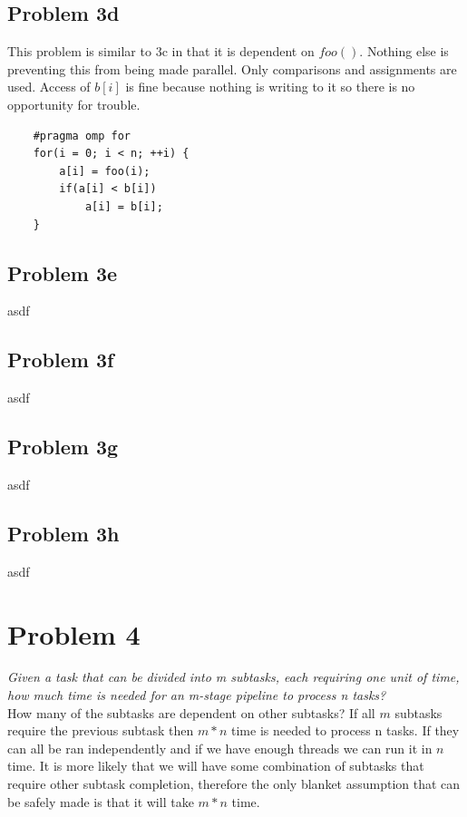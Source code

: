 \documentclass{article}
\begin{document}
\subsection{Problem 3d}
This problem is similar to 3c in that it is dependent on $foo()$. Nothing else is preventing this from being made parallel. Only comparisons and assignments are used. Access of $b[i]$ is fine because nothing is writing to it so there is no opportunity for trouble.
\begin{verbatim}
    #pragma omp for
    for(i = 0; i < n; ++i) {
        a[i] = foo(i);
        if(a[i] < b[i])
            a[i] = b[i];
    }
\end{verbatim}

\subsection{Problem 3e}
asdf

\subsection{Problem 3f}
asdf

\subsection{Problem 3g}
asdf

\subsection{Problem 3h}
asdf


\newpage
\section{Problem 4}
\textit{Given a task that can be divided into m subtasks, each requiring one unit of time, how much time is needed for an m-stage pipeline to process n tasks?}\\

How many of the subtasks are dependent on other subtasks? If all $m$ subtasks require the previous subtask then $m * n$ time is needed to process n tasks. If they can all be ran independently and if we have enough threads we can run it in $n$ time. It is more likely that we will have some combination of subtasks that require other subtask completion, therefore the only blanket assumption that can be safely made is that it will take $m * n$ time.
\end{document}
